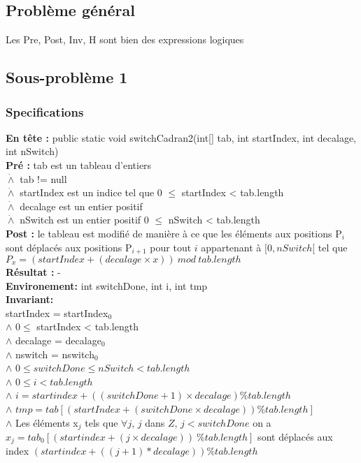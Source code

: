 \subsection{Problème général}
Les Pre, Post, Inv, H sont bien des expressions logiques 
\subsection{Sous-problème 1}

\subsubsection*{Specifications}
\noindent \textbf{En tête :} public static void switchCadran2(int[] tab, int startIndex, int decalage, int nSwitch)\\
\noindent \textbf{Pré : } tab est un tableau d'entiers\\
 	  \indent \indent $\dot{\wedge}$ tab != null\\
	  \indent \indent $\dot{\wedge}$ startIndex est un indice tel que 0 $\leq$ startIndex < tab.length \\
	  \indent \indent $\dot{\wedge}$ decalage est un entier positif \\
	  \indent \indent $\dot{\wedge}$ nSwitch est un entier positif 0 $\leq$ nSwitch < tab.length\\
\textbf{Post :}  le tableau est modifié de manière à ce que les éléments aux positions P$_{i}$ sont déplacés aux positions P$_{i+1}$ pour tout $i$ appartenant à $[0,nSwitch[$ tel que $P_{x} = (startIndex + (decalage\times x))\ mod\ tab.length$\\
\textbf{Résultat :}  - \\
\textbf{Environement: } int switchDone, int i, int tmp\\

\noindent \textbf{Invariant:}\\
\noindent startIndex = startIndex$_{0}$\\
$\wedge$ $0 \leq$ startIndex < tab.length \\
$\wedge$ decalage = decalage$_{0}$\\
$\wedge$ nswitch = nswitch$_{0}$\\
$\wedge$ $0\leq switchDone \leq nSwitch < tab.length$\\
$\wedge$ $0\leq i < tab.length$\\
$\wedge$ $i = startindex + ((switchDone+1)\times decalage) \% tab.length$\\
$\wedge$ $tmp = tab[(startIndex + (switchDone\times decalage))  \% tab.length]$\\
$\wedge$ Les éléments x$_{j}$ tels que $\forall j$, $j$ dans $Z$, $j<switchDone$ on a $x_{j}=tab_{0}[(startindex + (j\times decalage))\ \% tab.length]$ sont déplacés aux index $(startindex + ((j+1)* decalage))\%tab.length$\\

